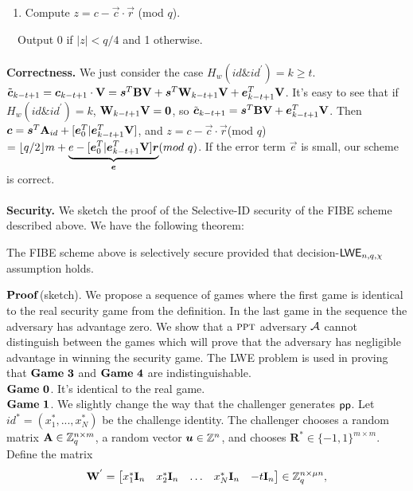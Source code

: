 \documentclass{llncs}
\begin{document}
\begin{appendix}
\begin{enumerate}
\item Compute $z=c-\vec{c}\cdot \vec{r}$ (mod $q$).
\end{enumerate}
~~Output $0$ if $|z|< q/4$ and 1 otherwise.\\
\\
\textbf{Correctness.} We just consider the case $H_{w}(id \& id^{'})=k\geq t$. $\tilde{\boldsymbol{c}}_{k-t+1}=\boldsymbol{c}_{k-t+1}\cdot \mathbf{V}=\boldsymbol{s}^{T}\mathbf{B}\mathbf{V}+\boldsymbol{s}^{T}\mathbf{W}_{k-t+1}\mathbf{V}+\boldsymbol{e}^{T}_{k-t+1}\mathbf{V}$. It's easy to see that if $H_{w}(id \& id^{'})=k$, $\mathbf{W}_{k-t+1}\mathbf{V}=\mathbf{0}$, so $\tilde{\boldsymbol{c}}_{k-t+1}=\boldsymbol{s}^{T}\mathbf{B}\mathbf{V}+\boldsymbol{e}^{T}_{k-t+1}\mathbf{V}$. Then $\boldsymbol{c}=\boldsymbol{s}^{T}\mathbf{A}_{id}+[\boldsymbol{e}^{T}_{0}|\boldsymbol{e}^{T}_{k-t+1}\mathbf{V}]$, and $z=c-\vec{c}\cdot \vec{r}$(mod $q$)$=\lfloor q/2 \rfloor m+\underbrace{e-[\vec{e}^{T}_{0}|\vec{e}^{T}_{k-t+1}\mat{V}]\vec{r}}_{\vec{e}}(mod\ q)$. If the error term $\vec{e}$ is small, our scheme is correct.\\
\\
\textbf{Security.} We sketch the proof of the Selective-ID security of the FIBE scheme described above. We have the following theorem:
\begin{theorem}
The FIBE scheme above is selectively secure provided that decision-$\mathsf{LWE}_{n,q,\chi}$ assumption holds.
\end{theorem}
\noindent $\mathbf{Proof}$(sketch). We propose a sequence of games where the first game is identical to the real security game from the definition. In the last game in the sequence the adversary has advantage zero. We show that a $\textsc{ppt}$ adversary $\mathcal{A}$ cannot distinguish between the games which will prove that the adversary has negligible advantage in winning the security game. The LWE problem is used in proving that $\mathbf{Game\ 3}$ and $\mathbf{Game\ 4}$ are indistinguishable.\\[0.2cm]
$\mathbf{Game\ 0}$. It's identical to the real game.\\[0.2cm]
$\mathbf{Game\ 1}$. We slightly change the way that the challenger generates $\mathsf{pp}$. Let $id^{*}=(x^{*}_{1},...,x^{*}_{N})$ be the challenge identity. The challenger chooses a random matrix $\mathbf{A} \in \mathbb{Z}^{n \times m}_{q}$, a random vector $\boldsymbol{u} \in \mathbb{Z}^{n}$, and chooses $\textbf{R}^{*}\in \{-1,1\}^{m \times m}$. Define the matrix
\begin{equation}
\mat{W}^{'}= \begin{bmatrix}
x^{*}_{1} \mat{I}_{n}&x^{*}_{2} \mat{I}_{n}&\ldots&x^{*}_{N} \mat{I}_{n}&-t \mat{I}_{n}
\end{bmatrix} \in \Z^{n \times \mu n}_{q},

\end{equation}
\end{appendix}
\end{document}
